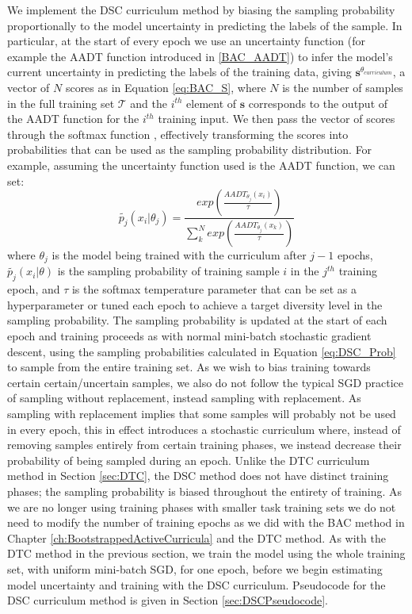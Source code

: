 We implement the DSC curriculum method by biasing the sampling probability proportionally to the model uncertainty in predicting the labels of the sample. In particular, at the start of every epoch we use an uncertainty function (for example the AADT function introduced in \ref{BAC_AADT}) to infer the model's current uncertainty in predicting the labels of the training data, giving $\mathbf{s}^{\theta_{curriculum}}$, a vector of $N$ scores as in Equation \ref{eq:BAC_S}, where $N$ is the number of samples in the full training set $\mathcal{T}$ and the $i^{th}$ element of $\mathbf{s}$ corresponds to the output of the AADT function for the $i^{th}$ training input. We then pass the vector of scores through the softmax function \cite{Theodoridis2009}, effectively transforming the scores into probabilities that can be used as the sampling probability distribution. For example, assuming the uncertainty function used is the AADT function, we can set:
\begin{equation}\label{eq:DSC_Prob}
\tilde{p_j}(x_i | \theta_j) = \frac{exp(\frac{AADT_{\theta_j}(x_i)}{\tau})}{\sum_{k}^{N} exp(\frac{AADT_{\theta_j}(x_k)}{\tau})}
\end{equation}
where $\theta_j$ is the model being trained with the curriculum after $j-1$ epochs, $\tilde{p_j}(x_i | \theta)$ is the sampling probability of training sample $i$ in the $j^{th}$ training epoch, and $\tau$ is the softmax temperature parameter that can be set as a hyperparameter or tuned each epoch to achieve a target diversity level in the sampling probability. The sampling probability is updated at the start of each epoch and training proceeds as with normal mini-batch stochastic gradient descent, using the sampling probabilities calculated in Equation \ref{eq:DSC_Prob} to sample from the entire training set. As we wish to bias training towards certain certain/uncertain samples, we also do not follow the typical SGD practice of sampling without replacement, instead sampling with replacement. As sampling with replacement implies that some samples will probably not be used in every epoch, this in effect introduces a stochastic curriculum where, instead of removing samples entirely from certain training phases, we instead decrease their probability of being sampled during an epoch. Unlike the DTC curriculum method in Section \ref{sec:DTC}, the DSC method does not have distinct training phases; the sampling probability is biased throughout the entirety of training. As we are no longer using training phases with smaller task training sets we do not need to modify the number of training epochs as we did with the BAC method in Chapter \ref{ch:BootstrappedActiveCurricula} and the DTC method. As with the DTC method in the previous section, we train the model using the whole training set, with uniform mini-batch SGD, for one epoch, before we begin estimating model uncertainty and training with the DSC curriculum. Pseudocode for the DSC curriculum method is given in Section \ref{sec:DSCPseudocode}.

